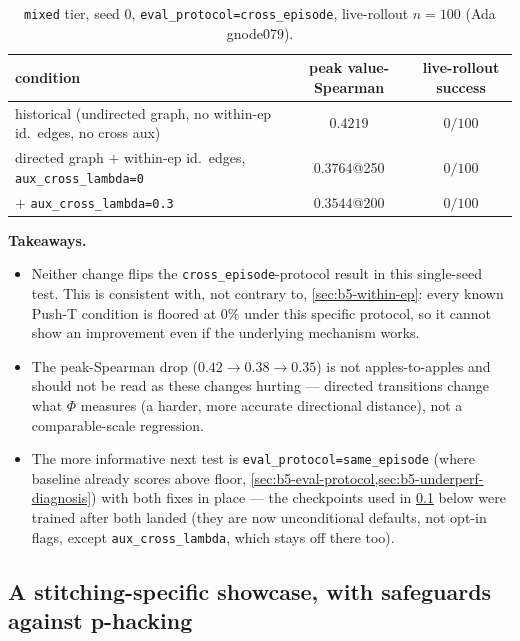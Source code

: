 \documentclass[11pt]{article}
\begin{document}
\begin{table}[h]
\centering
\small
\caption{\texttt{mixed} tier, seed 0, \texttt{eval\_protocol=cross\_episode}, live-rollout
$n=100$ (Ada gnode079).}
\begin{tabular}{p{8.8cm}cc}
\toprule
condition & peak value-Spearman & live-rollout success \\
\midrule
historical (undirected graph, no within-ep id.\ edges, no cross aux) & $0.4219$ & $0/100$ \\
directed graph $+$ within-ep id.\ edges, \texttt{aux\_cross\_lambda=0} & $0.3764$@250 & $0/100$ \\
$+$ \texttt{aux\_cross\_lambda=0.3} & $0.3544$@200 & $0/100$ \\
\bottomrule
\end{tabular}
\end{table}

\textbf{Takeaways.}
\begin{itemize}[leftmargin=1.4em,itemsep=2pt]
\item Neither change flips the \texttt{cross\_episode}-protocol result in this single-seed test.
This is consistent with, not contrary to, \cref{sec:b5-within-ep}: every known Push-T condition
is floored at $0\%$ under this specific protocol, so it cannot show an improvement even if the
underlying mechanism works.
\item The peak-Spearman drop ($0.42\to0.38\to0.35$) is not apples-to-apples and should not be
read as these changes hurting --- directed transitions change what $\Phi$ measures (a harder,
more accurate directional distance), not a comparable-scale regression.
\item The more informative next test is \texttt{eval\_protocol=same\_episode} (where baseline
already scores above floor, \cref{sec:b5-eval-protocol,sec:b5-underperf-diagnosis}) with both
fixes in place --- the checkpoints used in \cref{sec:b5-stitching-eval} below were trained after
both landed (they are now unconditional defaults, not opt-in flags, except
\texttt{aux\_cross\_lambda}, which stays off there too).
\end{itemize}

\subsection{A stitching-specific showcase, with safeguards against p-hacking}
\label{sec:b5-stitching-eval}
\end{document}
